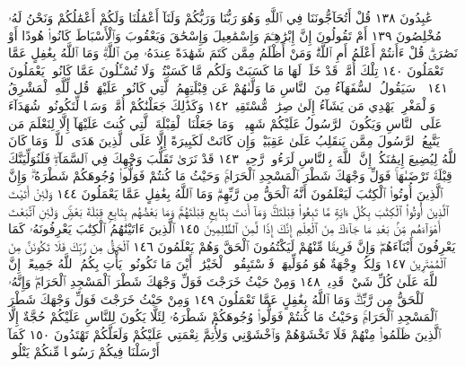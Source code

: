 عَٰبِدُونَ ١٣٨ قُلْ أَتُحَآجُّونَنَا فِي ٱللَّهِ وَهُوَ رَبُّنَا وَرَبُّكُمْ
وَلَنَآ أَعْمَٰلُنَا وَلَكُمْ أَعْمَٰلُكُمْ وَنَحْنُ لَهُۥ مُخْلِصُونَ ١٣٩
أَمْ تَقُولُونَ إِنَّ إِبْرَٰهِـۧمَ وَإِسْمَٰعِيلَ وَإِسْحَٰقَ وَيَعْقُوبَ
وَٱلْأَسْبَاطَ كَانُوا۟ هُودًا أَوْ نَصَٰرَىٰۗ قُلْ ءَأَنتُمْ أَعْلَمُ أَمِ
ٱللَّهُۗ وَمَنْ أَظْلَمُ مِمَّن كَتَمَ شَهَٰدَةً عِندَهُۥ مِنَ ٱللَّهِۗ وَمَا ٱللَّهُ
بِغَٰفِلٍ عَمَّا تَعْمَلُونَ ١٤٠ تِلْكَ أُمَّةࣱ قَدْ خَلَتْۖ لَهَا مَا كَسَبَتْ
وَلَكُم مَّا كَسَبْتُمْۖ وَلَا تُسْـَٔلُونَ عَمَّا كَانُوا۟ يَعْمَلُونَ ١٤١
۞ سَيَقُولُ ٱلسُّفَهَآءُ مِنَ ٱلنَّاسِ مَا وَلَّىٰهُمْ عَن قِبْلَتِهِمُ ٱلَّتِي كَانُوا۟
عَلَيْهَاۚ قُل لِّلَّهِ ٱلْمَشْرِقُ وَٱلْمَغْرِبُۚ يَهْدِي مَن يَشَآءُ إِلَىٰ صِرَٰطࣲ
مُّسْتَقِيمࣲ ١٤٢ وَكَذَٰلِكَ جَعَلْنَٰكُمْ أُمَّةࣰ وَسَطࣰا لِّتَكُونُوا۟
شُهَدَآءَ عَلَى ٱلنَّاسِ وَيَكُونَ ٱلرَّسُولُ عَلَيْكُمْ شَهِيدࣰاۗ وَمَا
جَعَلْنَا ٱلْقِبْلَةَ ٱلَّتِي كُنتَ عَلَيْهَآ إِلَّا لِنَعْلَمَ مَن يَتَّبِعُ ٱلرَّسُولَ
مِمَّن يَنقَلِبُ عَلَىٰ عَقِبَيْهِۚ وَإِن كَانَتْ لَكَبِيرَةً إِلَّا عَلَى ٱلَّذِينَ
هَدَى ٱللَّهُۗ وَمَا كَانَ ٱللَّهُ لِيُضِيعَ إِيمَٰنَكُمْۚ إِنَّ ٱللَّهَ
بِٱلنَّاسِ لَرَءُوفࣱ رَّحِيمࣱ ١٤٣ قَدْ نَرَىٰ تَقَلُّبَ وَجْهِكَ فِي ٱلسَّمَآءِۖ
فَلَنُوَلِّيَنَّكَ قِبْلَةࣰ تَرْضَىٰهَاۚ فَوَلِّ وَجْهَكَ شَطْرَ ٱلْمَسْجِدِ
ٱلْحَرَامِۚ وَحَيْثُ مَا كُنتُمْ فَوَلُّوا۟ وُجُوهَكُمْ شَطْرَهُۥۗ وَإِنَّ
ٱلَّذِينَ أُوتُوا۟ ٱلْكِتَٰبَ لَيَعْلَمُونَ أَنَّهُ ٱلْحَقُّ مِن رَّبِّهِمْۗ وَمَا ٱللَّهُ
بِغَٰفِلٍ عَمَّا يَعْمَلُونَ ١٤٤ وَلَئِنْ أَتَيْتَ ٱلَّذِينَ أُوتُوا۟ ٱلْكِتَٰبَ
بِكُلِّ ءَايَةࣲ مَّا تَبِعُوا۟ قِبْلَتَكَۚ وَمَآ أَنتَ بِتَابِعࣲ قِبْلَتَهُمْۚ
وَمَا بَعْضُهُم بِتَابِعࣲ قِبْلَةَ بَعْضࣲۚ وَلَئِنِ ٱتَّبَعْتَ أَهْوَآءَهُم مِّنۢ
بَعْدِ مَا جَآءَكَ مِنَ ٱلْعِلْمِ إِنَّكَ إِذࣰا لَّمِنَ ٱلظَّٰلِمِينَ ١٤٥
ٱلَّذِينَ ءَاتَيْنَٰهُمُ ٱلْكِتَٰبَ يَعْرِفُونَهُۥ كَمَا يَعْرِفُونَ أَبْنَآءَهُمْۖ
وَإِنَّ فَرِيقࣰا مِّنْهُمْ لَيَكْتُمُونَ ٱلْحَقَّ وَهُمْ يَعْلَمُونَ ١٤٦ ٱلْحَقُّ
مِن رَّبِّكَ فَلَا تَكُونَنَّ مِنَ ٱلْمُمْتَرِينَ ١٤٧ وَلِكُلࣲّ وِجْهَةٌ
هُوَ مُوَلِّيهَاۖ فَٱسْتَبِقُوا۟ ٱلْخَيْرَٰتِۚ أَيْنَ مَا تَكُونُوا۟ يَأْتِ بِكُمُ ٱللَّهُ
جَمِيعًاۚ إِنَّ ٱللَّهَ عَلَىٰ كُلِّ شَيْءࣲ قَدِيرࣱ ١٤٨ وَمِنْ حَيْثُ خَرَجْتَ
فَوَلِّ وَجْهَكَ شَطْرَ ٱلْمَسْجِدِ ٱلْحَرَامِۖ وَإِنَّهُۥ لَلْحَقُّ مِن رَّبِّكَۗ
وَمَا ٱللَّهُ بِغَٰفِلٍ عَمَّا تَعْمَلُونَ ١٤٩ وَمِنْ حَيْثُ خَرَجْتَ فَوَلِّ
وَجْهَكَ شَطْرَ ٱلْمَسْجِدِ ٱلْحَرَامِۚ وَحَيْثُ مَا كُنتُمْ فَوَلُّوا۟
وُجُوهَكُمْ شَطْرَهُۥ لِئَلَّا يَكُونَ لِلنَّاسِ عَلَيْكُمْ حُجَّةٌ إِلَّا ٱلَّذِينَ
ظَلَمُوا۟ مِنْهُمْ فَلَا تَخْشَوْهُمْ وَٱخْشَوْنِي وَلِأُتِمَّ نِعْمَتِي عَلَيْكُمْ
وَلَعَلَّكُمْ تَهْتَدُونَ ١٥٠ كَمَآ أَرْسَلْنَا فِيكُمْ رَسُولࣰا مِّنكُمْ يَتْلُوا۟
